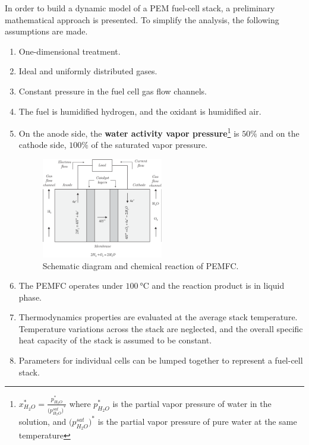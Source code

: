 \documentclass[11pt,a4paper]{article}
\numberwithin{equation}{section}
\theoremstyle{it}
\theoremstyle{definition}
\begin{document}
In order to build a dynamic model of a PEM fuel-cell stack, a preliminary mathematical approach is presented. To simplify the analysis, the following assumptions are made.
\begin{enumerate}
	\item One-dimensional treatment.
	\item Ideal and uniformly distributed gases.
	\item Constant pressure in the fuel cell gas flow channels.
	\item The fuel is humidified hydrogen, and the oxidant is humidified air.
	\item On the anode side, the \textbf{water activity vapor pressure}\footnote{$x^*_{H_2O}=\frac{p_{H_2O}^*}{\big(p_{H_2O}^{sat}\big)^*}$ where $p_{H_2O}^*$ is the partial vapor pressure of water in the solution, and $\big(p_{H_2O}^{sat}\big)^*$ is the partial vapor pressure of pure water at the same temperature} is $50\%$ and on the cathode side, $100\%$ of the saturated vapor pressure.
\begin{figure}[H]
	\centering
	\includegraphics[width = 0.5\textwidth, width = 320pt, angle = 0, keepaspectratio]{figures/pem_fuel_cell/pem_fuel_cell_0.eps}
	\captionsetup{width=0.5\textwidth}		
	\caption{Schematic diagram and chemical reaction of PEMFC.}
	\label{pem_fc_0}
\end{figure}
	\item The PEMFC operates under $\SI{100}{\celsius}$ and the reaction product is in liquid phase.
	\item Thermodynamics properties are evaluated at the average stack temperature. Temperature variations across the stack are neglected, and the overall specific heat capacity of the stack is assumed to be constant.
	\item Parameters for individual cells can be lumped together to represent a fuel-cell stack. 
\end{enumerate}
\end{document}
